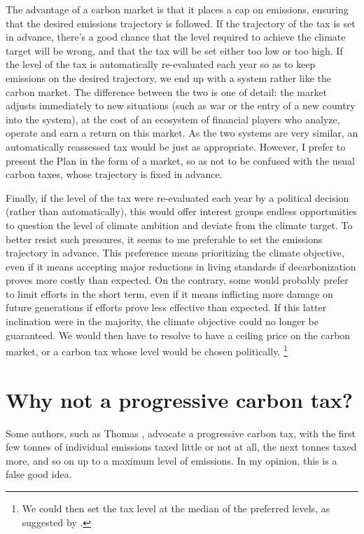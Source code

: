 \documentclass[a5paper,english,openany]{memoir}
\begin{document}
The advantage of a carbon market is that it places a cap on emissions, ensuring that the desired emissions trajectory is followed. If the trajectory of the tax is set in advance, there's a good chance that the level required to achieve the climate target will be wrong, and that the tax will be set either too low or too high. If the level of the tax is automatically re-evaluated each year so as to keep emissions on the desired trajectory, we end up with a system rather like the carbon market. The difference between the two is one of detail: the market adjusts immediately to new situations (such as war or the entry of a new country into the system), at the cost of an ecosystem of financial players who analyze, operate and earn a return on this market. As the two systems are very similar, an automatically reassessed tax would be just as appropriate. However, I prefer to present the Plan in the form of a market, so as not to be confused with the usual carbon taxes, whose trajectory is fixed in advance. 

Finally, if the level of the tax were re-evaluated each year by a political decision (rather than automatically), this would offer interest groups endless opportunities to question the level of climate ambition and deviate from the climate target. To better resist such pressures, it seems to me preferable to set the emissions trajectory in advance. This preference means prioritizing the climate objective, even if it means accepting major reductions in living standards if decarbonization proves more costly than expected. 
On the contrary, some would probably prefer to limit efforts in the short term, even if it means inflicting more damage on future generations if efforts prove less effective than expected. If this latter inclination were in the majority, the climate objective could no longer be guaranteed. We would then have to resolve to have a ceiling price on the carbon market, or a carbon tax whose level would be chosen politically. \footnote{We could then set the tax level at the median of the preferred levels, as suggested by \cite{weitzman_world_2017}.}

\section*{\normalsize Why not a progressive carbon tax?}\label{q:taxe_progressive}

Some authors, such as Thomas \cite{piketty_capital_2019}, advocate a progressive carbon tax, with the first few tonnes of individual emissions taxed little or not at all, the next tonnes taxed more, and so on up to a maximum level of emissions. In my opinion, this is a false good idea. 
\end{document}
